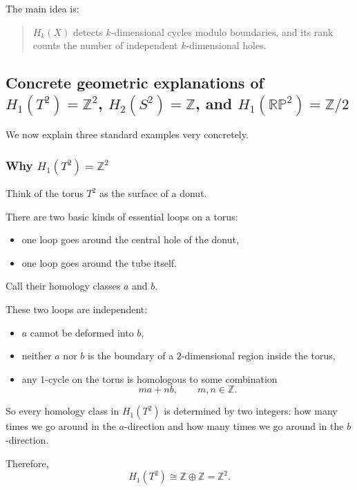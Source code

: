 \documentclass[12pt,a4paper]{article}
\theoremstyle{notespace}
\begin{document}
The main idea is:

\begin{quote}
	\(H_k(X)\) detects \(k\)-dimensional cycles modulo boundaries, and its rank counts the number of independent \(k\)-dimensional holes.
\end{quote}

\subsection{Concrete geometric explanations of
	\texorpdfstring{$H_1(T^2)=\mathbb Z^2$, $H_2(S^2)=\mathbb Z$, and $H_1(\mathbb{RP}^2)=\mathbb Z/2$}{H1(T2)=Z2, H2(S2)=Z, H1(RP2)=Z/2}} 

We now explain three standard examples very concretely.

\subsubsection{Why \texorpdfstring{$H_1(T^2)=\mathbb Z^2$}{H1(T2)=Z2}}

Think of the torus \(T^2\) as the surface of a donut.

There are two basic kinds of essential loops on a torus:

\begin{itemize}
	\item one loop goes around the central hole of the donut,
	\item one loop goes around the tube itself.
\end{itemize}

Call their homology classes \(a\) and \(b\).

These two loops are independent:

\begin{itemize}
	\item \(a\) cannot be deformed into \(b\),
	\item neither \(a\) nor \(b\) is the boundary of a \(2\)-dimensional region inside the torus,
	\item any \(1\)-cycle on the torus is homologous to some combination
	\[
	m a + n b, \qquad m,n\in\mathbb Z.
	\]
\end{itemize}

So every homology class in \(H_1(T^2)\) is determined by two integers: how many times we go around in the \(a\)-direction and how many times we go around in the \(b\)-direction.

Therefore,
\[
H_1(T^2)\cong \mathbb Z\oplus \mathbb Z=\mathbb Z^2.
\]
\end{document}
